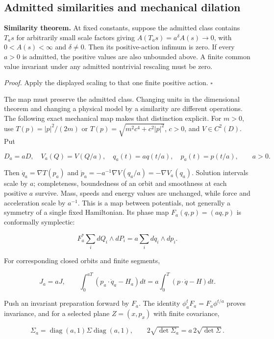 \documentclass[11pt,a4paper]{article}
\begin{document}
\hypertarget{admitted-similarities-and-mechanical-dilation}{%
\subsection{Admitted similarities and mechanical
dilation}\label{admitted-similarities-and-mechanical-dilation}}

\textbf{Similarity theorem.} At fixed constants, suppose the admitted
class contains \(T_a s\) for arbitrarily small scale factors giving
\(A(T_a s)=a^\delta A(s)\to0\), with \(0<A(s)<\infty\) and
\(\delta\ne0\). Then its positive-action infimum is zero. If every
\(a>0\) is admitted, the positive values are also unbounded above. A
finite common value invariant under any admitted nontrivial rescaling
must be zero.

\emph{Proof.} Apply the displayed scaling to that one finite positive
action. \(\square\)

The map must preserve the admitted class. Changing units in the
dimensional theorem and changing a physical model by a similarity are
different operations. The following exact mechanical map makes that
distinction explicit. For \(m>0\), use \(T(p)=|p|^2/(2m)\) or
\(T(p)=\sqrt{m^2c^4+c^2|p|^2}\), \(c>0\), and \(V\in C^2(D)\). Put

\[D_a=aD,\quad V_a(Q)=V(Q/a),\quad
q_a(t)=a q(t/a),\quad p_a(t)=p(t/a),\qquad a>0.\]

Then \(\dot q_a=\nabla T(p_a)\) and
\(\dot p_a=-a^{-1}\nabla V(q_a/a)=-\nabla V_a(q_a)\). Solution intervals
scale by \(a\); completeness, boundedness of an orbit and smoothness at
each positive \(a\) survive. Mass, speeds and energy values are
unchanged, while force and acceleration scale by \(a^{-1}\). This is a
map between potentials, not generally a symmetry of a single fixed
Hamiltonian. Its phase map \(F_a(q,p)=(aq,p)\) is conformally
symplectic:

\[F_a^*\sum_i dQ_i\wedge dP_i=a\sum_i dq_i\wedge dp_i.\]

For corresponding closed orbits and finite segments,

\[J_a=aJ,\qquad
\int_0^{aT}(p_a\cdot\dot q_a-H_a)dt
 =a\int_0^T(p\cdot\dot q-H)dt.\]

Push an invariant preparation forward by \(F_a\). The identity
\(\phi_a^tF_a=F_a\phi^{t/a}\) proves invariance, and for a selected
plane \(Z=(x,p_x)\) with finite covariance,

\[\Sigma_a=\operatorname{diag}(a,1)\Sigma\operatorname{diag}(a,1),\qquad
2\sqrt{\det\Sigma_a}=a\,2\sqrt{\det\Sigma}.\]
\end{document}
